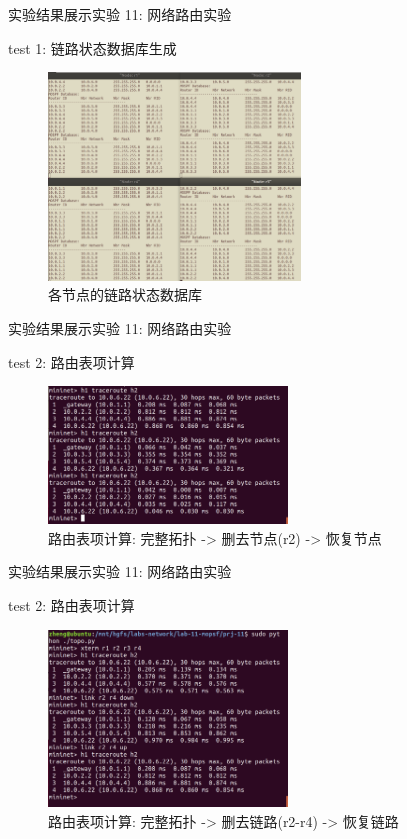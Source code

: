 \documentclass{beamer}
\begin{document}
\begin{frame}{实验结果展示}{实验 11: 网络路由实验}
    \begin{block}{test 1: 链路状态数据库生成}
        \begin{figure}[h]
            \centering %
            \includegraphics[width=190pt]{
                ../lab-11-mospf/readme.assets/p1-result.png}
            \caption{各节点的链路状态数据库} %
        \end{figure}
    \end{block}
\end{frame}
\begin{frame}{实验结果展示}{实验 11: 网络路由实验}
    \begin{block}{test 2: 路由表项计算}
        \begin{figure}[h]
            \centering %
            \includegraphics[width=180pt]{
                ../lab-11-mospf/readme.assets/p2-shut-node-r2.png}
            \caption{
                路由表项计算: 完整拓扑 -> 删去节点(r2) -> 恢复节点} %
        \end{figure}
    \end{block}
\end{frame}
\begin{frame}{实验结果展示}{实验 11: 网络路由实验}
    \begin{block}{test 2: 路由表项计算}
        \begin{figure}[h]
            \centering %
            \includegraphics[width=180pt]{
                ../lab-11-mospf/readme.assets/p2-shut-link-r2-to-r4.png}
            \caption{
                路由表项计算: 完整拓扑 -> 删去链路(r2-r4) -> 恢复链路} %
        \end{figure}
    \end{block}
\end{frame}
\end{document}
